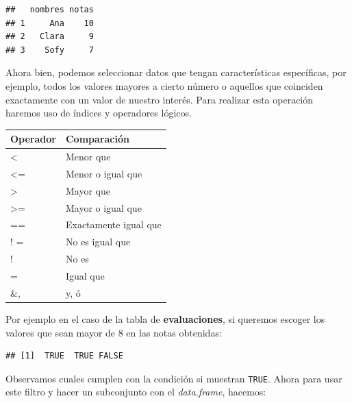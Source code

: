 \documentclass[
]{book}
\newenvironment{Shaded}{\begin{snugshade}}{\end{snugshade}}
\newcommand{\DecValTok}[1]{\textcolor[rgb]{0.00,0.00,0.81}{#1}}
\newcommand{\NormalTok}[1]{#1}
\newcommand{\OtherTok}[1]{\textcolor[rgb]{0.56,0.35,0.01}{#1}}
\newcommand{\SpecialCharTok}[1]{\textcolor[rgb]{0.81,0.36,0.00}{\textbf{#1}}}
\begin{document}
\begin{verbatim}
##   nombres notas
## 1     Ana    10
## 2   Clara     9
## 3    Sofy     7
\end{verbatim}

Ahora bien, podemos seleccionar datos que tengan características específicas, por ejemplo, todos los valores mayores a cierto número o aquellos que coinciden exactamente con un valor de nuestro interés.
Para realizar esta operación haremos uso de índices y operadores lógicos.

\begin{longtable}[]{@{}ll@{}}
\toprule\noalign{}
Operador & Comparación \\
\midrule\noalign{}
\endhead
\bottomrule\noalign{}
\endlastfoot
\textless{} & Menor que \\
\textless= & Menor o igual que \\
\textgreater{} & Mayor que \\
\textgreater= & Mayor o igual que \\
== & Exactamente igual que \\
! = & No es igual que \\
! & No es \\
= & Igual que \\
\&, \textbar{} & y, ó \\
\end{longtable}

Por ejemplo en el caso de la tabla de \textbf{evaluaciones}, si queremos escoger los valores que sean mayor de 8 en las notas obtenidas:

\begin{Shaded}
\end{Shaded}

\begin{verbatim}
## [1]  TRUE  TRUE FALSE
\end{verbatim}

Observamos cuales cumplen con la condición si muestran \texttt{TRUE}.
Ahora para usar este filtro y hacer un subconjunto con el \emph{data.frame}, hacemos:

\begin{Shaded}
\end{Shaded}
\end{document}
